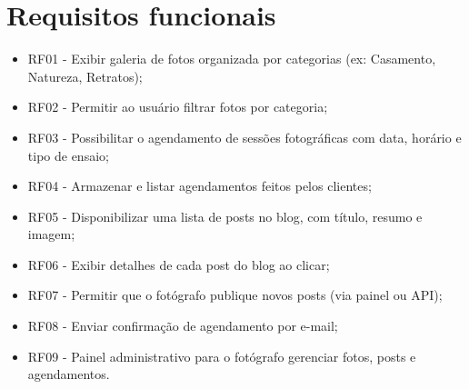 \begin{itemize}
 \end{itemize}

\section{Requisitos funcionais}
 \begin{itemize}
   \item RF01 - Exibir galeria de fotos organizada por categorias (ex: Casamento, Natureza, Retratos);
   \item RF02 - Permitir ao usuário filtrar fotos por categoria;
   \item RF03 - Possibilitar o agendamento de sessões fotográficas com data, horário e tipo de ensaio;
   \item RF04 - Armazenar e listar agendamentos feitos pelos clientes;
   \item RF05 - Disponibilizar uma lista de posts no blog, com título, resumo e imagem;
   \item RF06 - Exibir detalhes de cada post do blog ao clicar;
   \item RF07 - Permitir que o fotógrafo publique novos posts (via painel ou API);
   \item RF08 - Enviar confirmação de agendamento por e-mail;
   \item RF09 - Painel administrativo para o fotógrafo gerenciar fotos, posts e agendamentos.




    \end{itemize}










